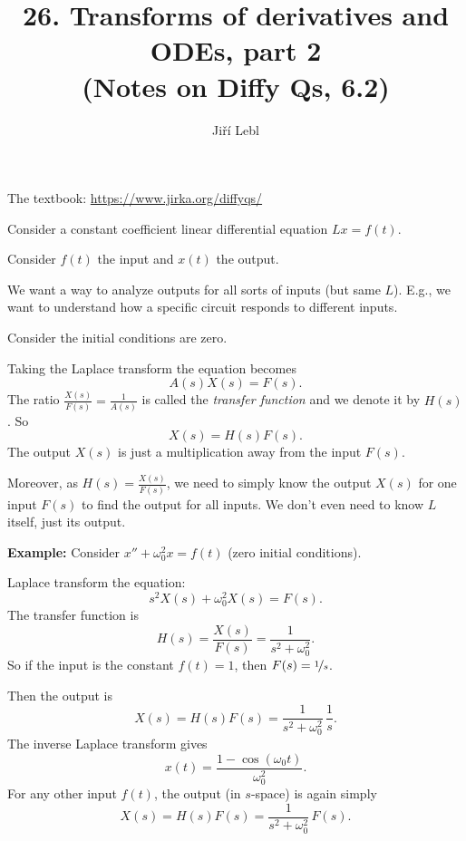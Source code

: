 \documentclass[10pt,aspectratio=169]{beamer}
\author{Ji\v{r}\'i Lebl}
\institute[OSU]{%
Oklahoma State University%
}
\title{26. Transforms of derivatives and ODEs, part 2\\(Notes on Diffy Qs, 6.2)}
\date{}
\begin{document}
\begin{frame}
\titlepage


\begin{center}
The textbook: \url{https://www.jirka.org/diffyqs/}
\end{center}
\end{frame}

\begin{frame}
Consider a constant coefficient linear differential equation
$L x = f(t)$.

\medskip
\pause

Consider $f(t)$ the input and $x(t)$ the output.

\medskip
\pause

We want a way to analyze outputs for all sorts of inputs (but same $L$).
E.g., we want to understand how a specific circuit responds to different
inputs.

\medskip
\pause

Consider the initial conditions are zero.

\medskip
\pause

Taking the Laplace transform the equation becomes
\[
A(s) X(s) = F(s) .
\]
\pause
The ratio $\frac{X(s)}{F(s)} = \frac{1}{A(s)}$ is called the
\emph{transfer function} and we denote it by $H(s)$.
\pause
So
\[
X(s) = H(s) F(s) .
\]
The output $X(s)$ is just a multiplication away
from the input $F(s)$.

\medskip
\pause

Moreover, as 
$H(s) = \frac{X(s)}{F(s)}$, we need to simply know the output $X(s)$ for one input
$F(s)$ to find the output for all inputs.
\pause
We don't even need to know $L$ itself, just its output.
\end{frame}

\begin{frame}
\textbf{Example:}
Consider $x'' + \omega_0^2 x = f(t)$ (zero initial conditions).

\medskip
\pause

Laplace transform the equation:
\[
s^2 X(s) + \omega_0^2 X(s) = F(s) .
\]
\pause
The transfer function is
\[
H(s) = \frac{X(s)}{F(s)} = \frac{1}{s^2 + \omega_0^2} .
\]
\pause
So if the input is the constant $f(t)=1$, then $F(s)=\nicefrac{1}{s}$.

\medskip
\pause

Then the output is
\[
X(s) = H(s) F(s) = \frac{1}{s^2+\omega_0^2} \, \frac{1}{s} .
\]
\pause
The inverse Laplace transform gives
\[
x(t) = \frac{1-\cos(\omega_0 t)}{\omega_0^2} .
\]
\pause
For any other input $f(t)$, the output (in $s$-space) is again simply
\[
X(s) = H(s) F(s) = \frac{1}{s^2+\omega_0^2} \, F(s) .
\]
\end{frame}
\end{document}
